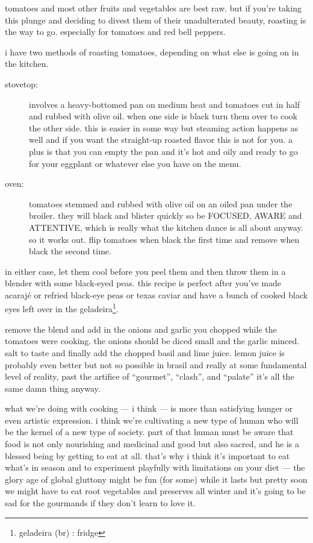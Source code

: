 tomatoes and most other fruits and vegetables are best raw. but if
you're taking this plunge and deciding to divest them of their
unadulterated beauty, roasting is the way to go. especially for
tomatoes and red bell peppers.

i have two methods of roasting tomatoes, depending on what else is
going on in the kitchen.

\begin{description}
  \item[stovetop:] involves a heavy-bottomed pan on medium heat and
  tomatoes cut in half and rubbed with olive oil. when one side is
  black turn them over to cook the other side. this is easier in some
  way but steaming action happens as well and if you want the
  straight-up roasted flavor this is not for you. a plus is that you
  can empty the pan and it's hot and oily and ready to go for your
  eggplant or whatever else you have on the menu.

  \item[oven:] tomatoes stemmed and rubbed with olive oil on an oiled
  pan under the broiler. they will black and blister quickly so be
  FOCUSED, AWARE and ATTENTIVE, which is really what the kitchen dance
  is all about anyway. so it works out. flip tomatoes when black the
  first time and remove when black the second time.
\end{description}

in either case, let them cool before you peel them and then throw them
in a blender with some black-eyed peas. this recipe is perfect after
you've made acaraj\'{e} or refried black-eye peas or texas caviar and
have a bunch of cooked black eyes left over in the
geladeira\footnote{geladeira (br) : fridge}.

remove the blend and add in the onions and garlic you chopped while
the tomatoes were cooking. the onions should be diced small and the
garlic minced. salt to taste and finally add the chopped basil and
lime juice. lemon juice is probably even better but not so possible in
brasil and really at some fundamental level of reality, past the
artifice of ``gourmet'', ``clash'', and ``palate'' it's all the same
damn thing anyway.

what we're doing with cooking --- i think --- is more than satisfying
hunger or even artistic expression. i think we're cultivating a new
type of human who will be the kernel of a new type of society. part of
that human must be aware that food is not only nourishing and
medicinal and good but also sacred, and he is a blessed being by
getting to eat at all. that's why i think it's important to eat what's
in season and to experiment playfully with limitations on your diet
--- the glory age of global gluttony might be fun (for some) while it
lasts but pretty soon we might have to eat root vegetables and
preserves all winter and it's going to be sad for the gourmands if
they don't learn to love it.

